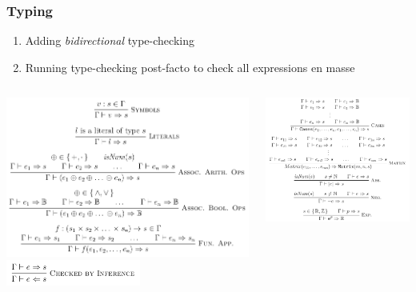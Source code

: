 \documentclass[xcolor={dvipsnames}]{beamer}
\begin{document}
\begin{frame}
  \frametitle{Typing}

  \begin{enumerate}
    \item Adding \emph{bidirectional} type-checking
    \item Running type-checking post-facto to check all expressions en masse
  \end{enumerate}

  \begin{columns}
    \begin{column}{0.475\textwidth}
      \begin{center}
        \includegraphics[width=\textwidth]{typeRulesLeft.png}
        \includegraphics[width=0.55\textwidth]{typeRulesCheckByInfer.png}
      \end{center}
    \end{column}
    \hfill
    \begin{column}{0.475\textwidth}
      \begin{center}
        \includegraphics[width=\textwidth]{typeRulesRight.png}

\end{center}
\end{column}
\end{columns}
\end{frame}
\end{document}
